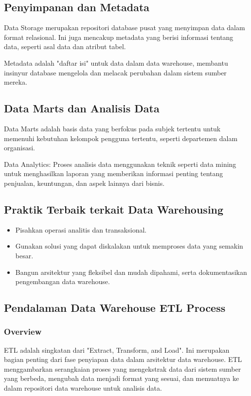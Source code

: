 \documentclass{article}
\begin{document}
\subsection{Penyimpanan dan Metadata}
Data Storage merupakan repositori database pusat yang menyimpan data dalam format relasional. Ini juga mencakup metadata yang berisi informasi tentang data, seperti asal data dan atribut tabel.

Metadata adalah "daftar isi" untuk data dalam data warehouse, membantu insinyur database mengelola dan melacak perubahan dalam sistem sumber mereka.

\subsection{Data Marts dan Analisis Data}
Data Marts adalah basis data yang berfokus pada subjek tertentu untuk memenuhi kebutuhan kelompok pengguna tertentu, seperti departemen dalam organisasi.

Data Analytics: Proses analisis data menggunakan teknik seperti data mining untuk menghasilkan laporan yang memberikan informasi penting tentang penjualan, keuntungan, dan aspek lainnya dari bisnis.

\subsection{Praktik Terbaik terkait Data Warehousing}
\begin{itemize}
    \item Pisahkan operasi analitis dan transaksional.
    \item Gunakan solusi yang dapat diskalakan untuk memproses data yang semakin besar.
    \item Bangun arsitektur yang fleksibel dan mudah dipahami, serta dokumentasikan pengembangan data warehouse.
\end{itemize}

\subsection{Pendalaman Data Warehouse ETL Process}
\subsubsection{Overview}
ETL adalah singkatan dari "Extract, Transform, and Load". Ini merupakan bagian penting dari fase penyiapan data dalam arsitektur data warehouse. ETL menggambarkan serangkaian proses yang mengekstrak data dari sistem sumber yang berbeda, mengubah data menjadi format yang sesuai, dan memuatnya ke dalam repositori data warehouse untuk analisis data.
\end{document}
